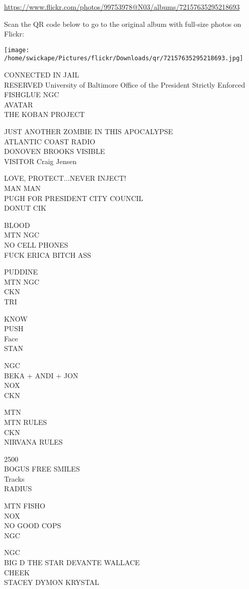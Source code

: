 \documentclass[10pt,letterpaper]{article}
\begin{document}
\url{https://www.flickr.com/photos/99753978@N03/albums/72157635295218693}

Scan the QR code below to go to the original album with full-size photos on Flickr:

\texttt{[image: /home/swickape/Pictures/flickr/Downloads/qr/72157635295218693.jpg]}


CONNECTED IN JAIL\\
RESERVED University of Baltimore Office of the President Strictly Enforced FISHGLUE NGC\\
AVATAR\\
THE KOBAN PROJECT

JUST ANOTHER ZOMBIE IN THIS APOCALYPSE\\
ATLANTIC COAST RADIO\\
DONOVEN BROOKS VISIBLE\\
VISITOR Craig Jensen

LOVE, PROTECT...NEVER INJECT!\\
MAN MAN\\
PUGH FOR PRESIDENT CITY COUNCIL\\
DONUT CIK

BLOOD\\
MTN NGC\\
NO CELL PHONES\\
FUCK ERICA BITCH ASS

PUDDINE\\
MTN NGC\\
CKN\\
TRI

KNOW\\
PUSH\\
Face\\
STAN

NGC\\
BEKA + ANDI + JON\\
NOX\\
CKN

MTN\\
MTN RULES\\
CKN\\
NIRVANA RULES

2500\\
BOGUS FREE SMILES\\
Tracks\\
RADIUS

MTN FISHO\\
NOX\\
NO GOOD COPS\\
NGC

NGC\\
BIG D THE STAR DEVANTE WALLACE\\
CHEEK\\
STACEY DYMON KRYSTAL
\end{document}
